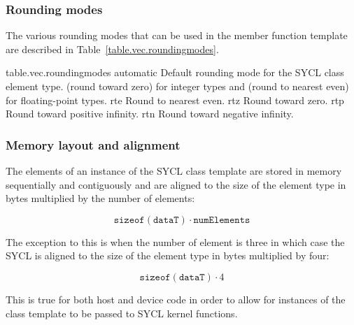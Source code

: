 \subsubsection{Rounding modes}

The various rounding modes that can be used in the  member function template are described in Table~\ref{table.vec.roundingmodes}.

{table.vec.roundingmodes}
  \addRow
    {automatic}
    {
      Default rounding mode for the SYCL  class element type.  (round toward zero) for integer types and  (round to nearest even) for floating-point types.
    }
  \addRow
    {rte}
    {
      Round to nearest even.
    }
  \addRow
    {rtz}
    {
      Round toward zero.
    }
  \addRow
    {rtp}
    {
      Round toward positive infinity.
    }
  \addRow
    {rtn}
    {
      Round toward negative infinity.
    }  
  \completeTable

\subsubsection{Memory layout and alignment}
\label{memory-layout-and-alignment}

The elements of an instance of the SYCL  class template are stored in memory sequentially and contiguously and are aligned to the size of the element type in bytes multiplied by the number of elements:

\begin{equation}
\label{vec-memory-alignment}
\texttt{sizeof}(\texttt{dataT}) \cdot \texttt{numElements}
\end{equation}

The exception to this is when the number of element is three in which case the SYCL  is aligned to the size of the element type in bytes multiplied by four:

\begin{equation}
\label{vec3-memory-alignment}
\texttt{sizeof}(\texttt{dataT}) \cdot 4
\end{equation}

This is true for both host and device code in order to allow for instances of the  class template to be passed to SYCL kernel functions.

